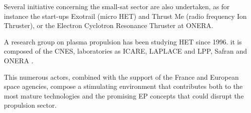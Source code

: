  
 Several initiative concerning the small-sat sector are also undertaken, as for instance the start-ups Exotrail (micro \ac{HET}) and Thrust Me (radio frequency Ion Thruster), or the Electron Cyclotron Resonance Thruster at ONERA.
 
 A research group on plasma propulsion has been studying \ac{HET} since 1996.
 it is composed of the \ac{CNES}, laboratories as ICARE, LAPLACE and LPP, Safran and ONERA \citep{boniface2017}.
 
 This numerous actors, combined with the support of the France and European space agencies, compose a stimulating environment that contributes both to the most mature technologies and the promising \ac{EP} concepts that could disrupt the propulsion sector.
 
